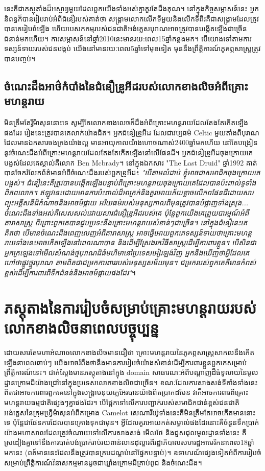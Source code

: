 \documentclass[10pt,twocolumn,letterpaper]{article}
\begin{document}
	នេះគឺជាភស្ថុតាំងដ៏អស្ចារ្យមួយដែលពួកយើងទាំងអស់គ្នាគួរតែដឹងគុណ។ នៅក្នុងកិច្ចសម្ភាសន៍នេះ អ្នកនិពន្ធក៏បានរៀបរាប់អំពីជំនឿរបស់គាត់ថា សង្គ្រាមលោកលើកទីមួយនិងលើកទីពីរគឺជាសង្គ្រាមដែលត្រូវបានគេរៀបចំឡើង ហើយបេសកកម្មរបស់ជនជាតិអង់គ្លេសបុរាណអាចត្រូវបានបង្កើតឡើងជាច្រើនជំនាន់មកហើយ។ ការសម្ភាសន៍នៅឆ្នាំ2010នេះមានរយ:ពេល15ឆ្នាំកន្លងមក។ បើយោងទៅតាមការទស្សន៍ទាយរបស់ជនបង្កប់ យើងនៅមានរយៈពេល5ឆ្នាំទៅមុខទៀត មុននឹងព្រឹត្តិការណ៍ភូគព្ភសាស្ត្រត្រូវបានបញ្ចប់។
\subsection{ចំណេះដឹងអាថ៌កំបាំងនៃជំនឿឌ្រូអីដរបស់លោកខាងលិចអំពីគ្រោះមហន្តរាយ}

	មិនត្រឹមតែរ្វីម៉ាសុននោះទេ សូម្បីតែលោកខាងលេចក៏ដឹងអំពីគ្រោះមហន្តរាយដែលតែងតែកើតឡើងផងដែរ រឿងនេះត្រូវបានគេលាក់យ៉ាងជិត។ អ្នកជំនឿឌ្រូអីដ ដែលជាវប្បធម៌ Celtic មួយតាំងពីបុរាណដែលមានឯកសារចងក្រងយ៉ាងល្អ មានអាយុកាលយ៉ាងហោចណាស់2400ឆ្នាំមកហើយ\cite{7} នៅតែបង្រៀននូវចំណេះដឹងអំពីគ្រោះមហន្តរាយដែលតែងតែកើតឡើងនៅលើផែនដី។ អ្នកជំនឿឌ្រូអីដចុងក្រោយគេបង្អស់ដែលគេស្គាល់គឺលោក Ben Mcbrady។ នៅក្នុងឯកសារ "The Last Druid" ឆ្នាំ1992 គាត់បានចែករំលែកព័ត៌មានអំពីចំណេះដឹងរបស់ពួកឌ្រូអីដ៖ \textit{"បើតាមលំដាប់ ខ្ញុំអាចជាសមាជិកចុងក្រោយគេបង្អស់។ ជំនឿនេះគឺត្រូវបានបង្កើតឡើងបន្ទាប់ពីគ្រោះមហន្តរាយចុងក្រោយគេដែលបានប៉ះពាល់ទូទាំងពិភពលោក។ ឥឡូវនេះដោយមានការប៉ះពាល់ដ៏អាក្រក់​និងគួរអោយភ័យខ្លាចលើភពផែនដីដោយសារព្យុះអគ្គីសនីដ៏កំណាចនិងអាចម៍ផ្កាយ អរិយធម៌របស់មនុស្សកាលពីមុនត្រូវបានបំផ្លាញទាំងស្រុង... ចំណេះដឹងទាំងអស់គឺសេសសល់ដោយសារជំនឿឌ្រូអីដរបស់គេ ប៉ុន្តែពួកយើងគេព្រួយបារម្មណ៍អំពីតារាសាស្ត្រ ពីព្រោះពួកគេបានជួបប្រទះនឹងគ្រោះមហន្តរាយសំខាន់ៗជាច្រើន។ នៅក្នុងជំនឿនេះ​គេគិតថា បើមានចំណេះដឹងពេញលេញអំពីតារាសាស្ត្រ អាចធ្វើអោយពួកគេទស្សន៍ទាយថាគ្រោះមហន្តរាយទាំងនេះអាចកើតឡើងនៅពេលណាបាន និងដើម្បីស្រែងរកវិធីសាស្ត្រដើម្បីការពារខ្លួន។ បើសិនជាអ្នកក្រឡេងទៅមើលសំណង់ថ្មបុរាណដ៏ធំមហិមានៅប្រទេសអៀរឡង់វិញ អ្នកនឹងឃើញថាអ្វីដែលគេហៅថាផ្លូវថ្នូរបុរាណ តាមពិតជាជម្រកការពាររបស់មនុស្សសម័យមុន។ ជម្រករបស់ពួកគេគឺមានកំពស់ខ្ពស់ដើម្បីការពារពីទឹកជំនន់និងអាចម៍ផ្កាយផងដែរ"}\cite{8,9}។

\section{ភស្តុតាងនៃការរៀបចំសម្រាប់គ្រោះមហន្តរាយរបស់លោកខាងលិចនាពេលបច្ចុប្បន្ន}

	ដោយសារតែមហាអំណាចលោកខាងលិចមានជឿថា គ្រោះមហន្តរាយនៃភូគព្ភសាស្ត្រសាកលនឹងកើតឡើងនាពេលឆាប់ៗ យើងអាចរំពឹងថានឹងមានការរៀបចំយ៉ាងសំខាន់ដើម្បីការពារខ្លួនពួកគេសម្រាប់ព្រឹត្តិការណ៍នេះ។  ជាក់ស្តែងមានភស្តុតាងនៅក្នុង domain សាធារណៈអំពីបណ្តាញដ៏ធំទូលាយនៃមូលដ្ឋានក្រោមដីយ៉ាងជ្រៅនៅក្នុងប្រទេសលោកខាងលិចជាច្រើន។ ខណៈដែលការសាងសង់ទីតាំងទាំងនេះពិតជាអាចការពារពួកគេនៅក្នុងសង្គ្រាមនុយក្លេអ៊ែរបានយ៉ាងពិតប្រាកដមែន វាក៏អាចការពារពីគ្រោះមហន្តរាយធម្មជាតិផ្សេងៗគ្នាផងដែរ។ បើផ្អែកទៅលើការបញ្ជាក់របស់សមាជិកជាន់ខ្ពស់ជនជាតិអង់គ្លេសនៃ​ក្រុមហ្វ្រីម៉ាសុនអំពីគម្រោង Camelot\cite{4,6} សេណារីយ៉ូទាំងនេះគឺមិនត្រឹមតែអាចកើតមាននោះទេ​ ប៉ុន្តែជាផែនការដែលបានគ្រោងទុកជាមុន។ អ្វីដែលគួរអោយកត់សម្គាល់ផងដែរនោះ​គឺចំនួនទឹកប្រាក់យ៉ាងមហាសាលដែលត្រូវចំណាយទៅលើការសាងសង់ មើលថែ និងជួសជុលមូលដ្ឋានទាំងនេះ គឺស្រដៀងគ្នាទៅនឹងការបាត់បង់ប្រាក់រាប់រយពាន់លានដុល្លារពីរដ្ឋាភិបាលសហរដ្ឋអាមេរិកនាពេល18ឆ្នាំមកនេះ (ពត៍មាននេះដែលនឹងត្រូវបានគ្របដណ្តប់នៅផ្នែកបន្ទាប់)\cite{11,12,13}។ ឧទាហរណ៍ផ្សេងទៀតអំពីការរៀបចំសម្រាប់ព្រឹត្តិការណ៍វិនាសកម្មមានដូចជាឃ្លាំងក្រោមដីគ្រាប់ពូជ និងចំណេះដឹង។
\end{document}
